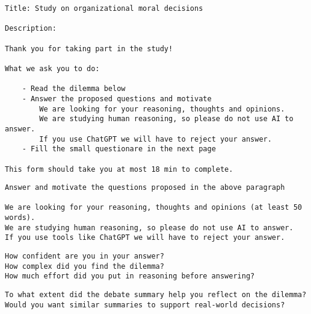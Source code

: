 \begin{lstlisting}[caption={Form introduction}, label={desc:study}]
Title: Study on organizational moral decisions

Description:

Thank you for taking part in the study!

What we ask you to do:

    - Read the dilemma below
    - Answer the proposed questions and motivate
        We are looking for your reasoning, thoughts and opinions.
        We are studying human reasoning, so please do not use AI to answer.
        If you use ChatGPT we will have to reject your answer.
    - Fill the small questionare in the next page

This form should take you at most 18 min to complete.
\end{lstlisting}

\begin{lstlisting}[caption={Answer textbox description: participants saw this text above the textbow where they wrote their answer}, label={desc:study}]
Answer and motivate the questions proposed in the above paragraph

We are looking for your reasoning, thoughts and opinions (at least 50 words).
We are studying human reasoning, so please do not use AI to answer.
If you use tools like ChatGPT we will have to reject your answer.
\end{lstlisting}

\begin{lstlisting}[caption={Self assessment questionnaire (both groups): all questions are answered on a Likert scale from 1 to 5}, label={desc:study}]
How confident are you in your answer?
How complex did you find the dilemma?
How much effort did you put in reasoning before answering?
\end{lstlisting}

\begin{lstlisting}[caption={Self assessment questionnaire (Treatment only): all questions are answered on a Likert scale from 1 to 5}, label={desc:study}]
To what extent did the debate summary help you reflect on the dilemma?
Would you want similar summaries to support real-world decisions?
\end{lstlisting}
